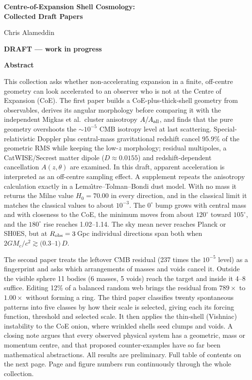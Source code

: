 \documentclass[11pt,a4paper]{article}
\begin{document}
\pagestyle{empty}
\begin{center}\vspace*{0.8cm}
{\LARGE\bfseries Centre-of-Expansion Shell Cosmology:\\[4pt] Collected Draft Papers\par}\vspace{0.7cm}
{\Large Chris Alameddin\par}\vspace{0.3cm}{\large October 2026\par}\vspace{0.4cm}
{\large\bfseries DRAFT --- work in progress\par}\vspace{0.6cm}
{\bfseries Abstract\par}\end{center}\vspace{-2pt}
\normalsize
This collection asks whether non-accelerating expansion in a finite, off-centre geometry can look accelerated to an observer who is not at the Centre of Expansion (CoE). The first paper builds a CoE-plus-thick-shell geometry from observables, derives its angular morphology before comparing it with the independent Migkas et al.\ cluster anisotropy $A/A_{\rm all}$, and finds that the pure geometry overshoots the $\sim10^{-5}$ CMB isotropy level at last scattering. Special-relativistic Doppler plus central-mass gravitational redshift cancel 95.9\% of the geometric RMS while keeping the low-$z$ morphology; residual multipoles, a CatWISE/Secrest matter dipole ($D\approx0.0155$) and redshift-dependent cancellation $A(z,\theta)$ are examined. In this draft, apparent acceleration is interpreted as an off-centre sampling effect. A supplement repeats the anisotropy calculation exactly in a Lema\^{\i}tre--Tolman--Bondi dust model. With no mass it returns the Milne value $H_0=70.00$ in every direction, and in the classical limit it matches the classical values to about $10^{-3}$. The $0^\circ$ bump grows with central mass and with closeness to the CoE, the minimum moves from about $120^\circ$ toward $105^\circ$, and the $180^\circ$ rise reaches 1.02--1.14. The sky mean never reaches Planck or SH0ES, but at $R_{\rm obs}=3$\,Gpc individual directions span both when $2GM_c/c^2\gtrsim(0.3$--$1)\,D$.

The second paper treats the leftover CMB residual (237 times the $10^{-5}$ level) as a fingerprint and asks which arrangements of masses and voids cancel it. Outside the visible sphere 11 bodies (6 masses, 5 voids) reach the target and inside it 4--8 suffice. Editing 12\% of a balanced random web brings the residual from $789\times$ to $1.00\times$ without forming a ring. The third paper classifies twenty spontaneous patterns into five classes by how their scale is selected, giving each its forcing function, threshold and selected scale. It then applies the thin-shell (Vishniac) instability to the CoE onion, where wrinkled shells seed clumps and voids. A closing note argues that every observed physical system has a geometric, mass or momentum centre, and that proposed counter-examples have so far been mathematical abstractions. All results are preliminary.
\vfill
\noindent\footnotesize Full table of contents on the next page. Page and figure numbers run continuously through the whole collection.
\end{document}
